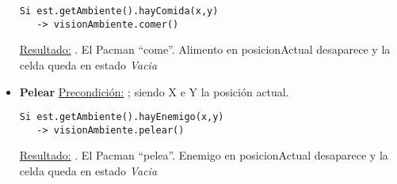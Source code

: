 \begin{itemize}
\begin{verbatim}
Si est.getAmbiente().hayComida(x,y)
   -> visionAmbiente.comer()
\end{verbatim}

\underline{Resultado:} . El Pacman ``come''.
Alimento en posicionActual desaparece y la celda queda en estado \textit{Vacia}

\item \textbf{Pelear}\newline
\underline{Precondición:} 
\newline
{};
\newline
siendo X e Y la posición actual.

\begin{verbatim}
Si est.getAmbiente().hayEnemigo(x,y)
   -> visionAmbiente.pelear()
\end{verbatim}

\underline{Resultado:} . El Pacman ``pelea''.
Enemigo en posicionActual desaparece y la celda queda en estado \textit{Vacia}

\end{itemize}
